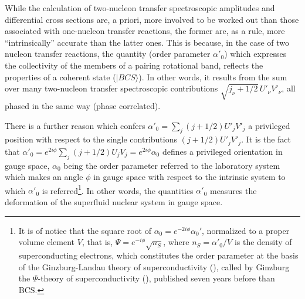 While the calculation of two-nucleon transfer spectroscopic amplitudes and differential cross sections are, a priori, more involved to be worked out than those associated with one-nucleon transfer reactions, the former are, as a rule, more ``intrinsically'' accurate than the latter ones. This is because, in the case of two nucleon transfer reactions, the quantity (order parameter $\alpha'_0$) which expresses the collectivity of the members of a pairing rotational band, reflects the properties of a coherent state ($|BCS\rangle$). In other words, it results from the sum over many two-nucleon transfer spectroscopic contributions $\sqrt{j_{\nu}+1/2}\,U'_\nu V'_\nu$, all phased in the same way (phase correlated).

There is a further reason which confers $\alpha'_0=\sum_j(j+1/2)U'_jV'_j$ a privileged position with respect to the single contributions $(j+1/2)U'_jV'_j$. It is the fact that $\alpha'_0=e^{2i\phi}\sum_j(j+1/2)U_jV_j=e^{2i\phi}\alpha_0$ defines a privileged orientation in gauge space, $\alpha_0$ being the order parameter referred to the laboratory system which makes an angle $\phi$ in gauge space with respect to the intrinsic system to which $\alpha'_0$ is referred\footnote{It is of notice that the square root of $\alpha_0=e^{-2i\phi}\alpha_0'$, normalized to a proper volume element $V$, that is, $\Psi=e^{-i\phi}\sqrt{n_S}$, where $n_S=\alpha'_0/V$ is the density of superconducting electrons, which constitutes the order parameter at the basis of the Ginzburg-Landau theory of superconductivity (\cite{Ginzburg:50}), called by Ginzburg the $\Psi$-theory of superconductivity (\cite{Ginzburg:04}), published seven years before than BCS.}. In other words, the quantities $\alpha'_0$  measures the deformation of the superfluid nuclear system in gauge space. 

